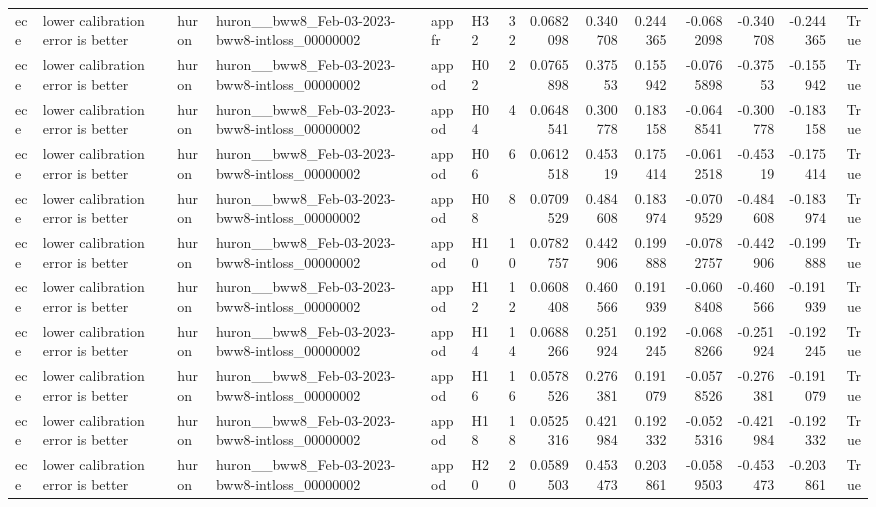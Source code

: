 \begin{longtable}{llllllrrrrrrrr}
ece & lower calibration error is better & huron & huron\_\_bww8\_Feb-03-2023-bww8-intloss\_00000002 & appfr & H32 & 32 & 0.0682098 & 0.340708 & 0.244365 & -0.0682098 & -0.340708 & -0.244365 & True \\
ece & lower calibration error is better & huron & huron\_\_bww8\_Feb-03-2023-bww8-intloss\_00000002 & appod & H02 & 2 & 0.0765898 & 0.37553 & 0.155942 & -0.0765898 & -0.37553 & -0.155942 & True \\
ece & lower calibration error is better & huron & huron\_\_bww8\_Feb-03-2023-bww8-intloss\_00000002 & appod & H04 & 4 & 0.0648541 & 0.300778 & 0.183158 & -0.0648541 & -0.300778 & -0.183158 & True \\
ece & lower calibration error is better & huron & huron\_\_bww8\_Feb-03-2023-bww8-intloss\_00000002 & appod & H06 & 6 & 0.0612518 & 0.45319 & 0.175414 & -0.0612518 & -0.45319 & -0.175414 & True \\
ece & lower calibration error is better & huron & huron\_\_bww8\_Feb-03-2023-bww8-intloss\_00000002 & appod & H08 & 8 & 0.0709529 & 0.484608 & 0.183974 & -0.0709529 & -0.484608 & -0.183974 & True \\
ece & lower calibration error is better & huron & huron\_\_bww8\_Feb-03-2023-bww8-intloss\_00000002 & appod & H10 & 10 & 0.0782757 & 0.442906 & 0.199888 & -0.0782757 & -0.442906 & -0.199888 & True \\
ece & lower calibration error is better & huron & huron\_\_bww8\_Feb-03-2023-bww8-intloss\_00000002 & appod & H12 & 12 & 0.0608408 & 0.460566 & 0.191939 & -0.0608408 & -0.460566 & -0.191939 & True \\
ece & lower calibration error is better & huron & huron\_\_bww8\_Feb-03-2023-bww8-intloss\_00000002 & appod & H14 & 14 & 0.0688266 & 0.251924 & 0.192245 & -0.0688266 & -0.251924 & -0.192245 & True \\
ece & lower calibration error is better & huron & huron\_\_bww8\_Feb-03-2023-bww8-intloss\_00000002 & appod & H16 & 16 & 0.0578526 & 0.276381 & 0.191079 & -0.0578526 & -0.276381 & -0.191079 & True \\
ece & lower calibration error is better & huron & huron\_\_bww8\_Feb-03-2023-bww8-intloss\_00000002 & appod & H18 & 18 & 0.0525316 & 0.421984 & 0.192332 & -0.0525316 & -0.421984 & -0.192332 & True \\
ece & lower calibration error is better & huron & huron\_\_bww8\_Feb-03-2023-bww8-intloss\_00000002 & appod & H20 & 20 & 0.0589503 & 0.453473 & 0.203861 & -0.0589503 & -0.453473 & -0.203861 & True \\

\end{longtable}

